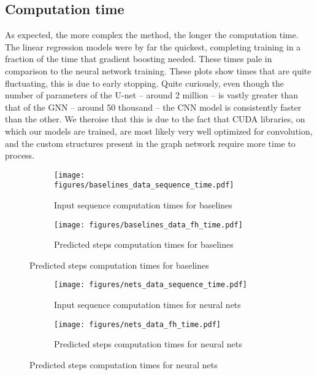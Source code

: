 \subsection{Computation time}
As expected, the more complex the method, the longer the computation time. The linear regression models were by far the quickest, completing training in a fraction of the time that gradient boosting needed. These times pale in comparison to the neural network training. These plots show times that are quite fluctuating, this is due to early stopping. Quite curiously, even though the number of parameters of the U-net -- around 2 million -- is vastly greater than that of the GNN -- around 50 thousand -- the CNN model is consistently faster than the other. We theroise that this is due to the fact that CUDA libraries, on which our models are trained, are most likely very well optimized for convolution, and the custom structures present in the graph network require more time to process.

\begin{figure}
\centering
  \begin{subfigure}[b]{0.49\textwidth}
    \texttt{[image: figures/baselines\_data\_sequence\_time.pdf]}
    \caption{Input sequence computation times for baselines}
    \label{fig:1}
  \end{subfigure}
 \hfill
  \begin{subfigure}[b]{0.49\textwidth}
    \texttt{[image: figures/baselines\_data\_fh\_time.pdf]}
    \caption{Predicted steps computation times for baselines}
    \label{fig:baselines-computation-times}
  \end{subfigure}
\end{figure}

\begin{figure}
\centering
  \begin{subfigure}[b]{0.49\textwidth}
    \texttt{[image: figures/nets\_data\_sequence\_time.pdf]}
    \caption{Input sequence computation times for neural nets}
    \label{fig:1}
  \end{subfigure}
 \hfill
  \begin{subfigure}[b]{0.49\textwidth}
    \texttt{[image: figures/nets\_data\_fh\_time.pdf]}
    \caption{Predicted steps computation times for neural nets}
    \label{fig:nets-computation-times}
  \end{subfigure}
\end{figure}

\FloatBarrier

